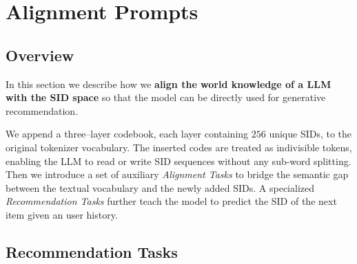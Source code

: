 \newpage
\appendix

\section{Alignment Prompts}
\label{appendix:align_prompt}

\subsection{Overview}
In this section we describe how we \textbf{align the world knowledge of a LLM with the SID space} so that the model can be directly used for generative recommendation.  

We append a three–layer codebook, each layer containing $256$ unique SIDs, to the original tokenizer vocabulary. The inserted codes are treated as indivisible tokens, enabling the LLM to read or write SID sequences without any sub-word splitting.
Then we introduce a set of auxiliary \emph{Alignment Tasks} to bridge the semantic gap between the textual vocabulary and the newly added SIDs. 
A specialized \emph{Recommendation Tasks} further teach the model to predict the SID of the next item given an user history.

\subsection{Recommendation Tasks}


